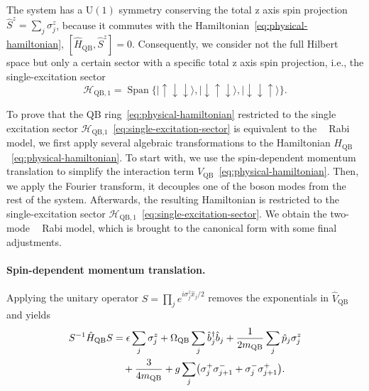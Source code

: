 \documentclass[reprint, aps, prx, amsmath, amssymb, longbibliography, superscriptaddress]{revtex4-2}
\DeclareMathOperator{\Zthree}{\mathbb{Z}_3}
\begin{document}
The system has a $\mathrm{U(1)}$ symmetry conserving the total z axis spin projection $\hat S^z = \sum_j
\sigma_j^z$, because it commutes with the Hamiltonian~\eqref{eq:physical-hamiltonian}, $[ \hat H_{\text{QB}}, \hat S^z ] = 0$. Consequently, we consider not the full Hilbert space but only a certain sector with a specific total z axis spin projection, i.e., 
the single-excitation sector
\begin{equation}
\label{eq:single-excitation-sector}
  \mathcal H_{\text{QB},1} = \operatorname{Span}\bigl\{ |
    \uparrow\downarrow\downarrow\rangle,
    |\downarrow\uparrow\downarrow\rangle,
    |\downarrow\downarrow\uparrow\rangle \bigr\}.
\end{equation}

To prove that the QB ring~\eqref{eq:physical-hamiltonian} restricted to the single excitation sector $\mathcal{H}_{\text{QB,1}}$~\eqref{eq:single-excitation-sector} is equivalent to the $\Zthree$ Rabi model, we first apply several algebraic transformations to the Hamiltonian $H_{\text{QB}}$~\eqref{eq:physical-hamiltonian}. To start with, we use the spin-dependent momentum translation to simplify the interaction term $V_{\text{QB}}$~\eqref{eq:physical-hamiltonian}. Then, we apply the Fourier transform, it decouples one of the boson modes from the rest of the system. Afterwards, the resulting Hamiltonian is restricted to the single-excitation sector $\mathcal{H}_{\text{QB},1}$~\eqref{eq:single-excitation-sector}. We obtain the two-mode $\Zthree$ Rabi model, which is brought to the canonical form with some final adjustments.

\paragraph{Spin-dependent momentum translation.}
Applying the unitary operator
$S = \prod_j e^{ i \sigma_j^z \hat x_j / 2 }$ removes the exponentials in
$\hat V_{\text{QB}}$ and yields
\begin{align}
\label{eq:after-momentum-translation}
    S^{-1} \hat H_{\text{QB}} S &= \epsilon \sum_{j} \sigma_j^z
      + \Omega_{\text{QB}} \sum_j \hat b_j^{\dagger} \hat b_j
      + \frac{1}{2 m_{\text{QB}}} \sum_j \hat p_j \sigma_j^z \notag
      \\
      &\quad + \frac{3}{4 m_{\text{QB}}}
      + g \sum_{j}
        \bigl( \sigma_j^{+} \sigma_{j+1}^{-} + \sigma_j^{-} \sigma_{j+1}^{+} \bigr).
\end{align}
\end{document}
